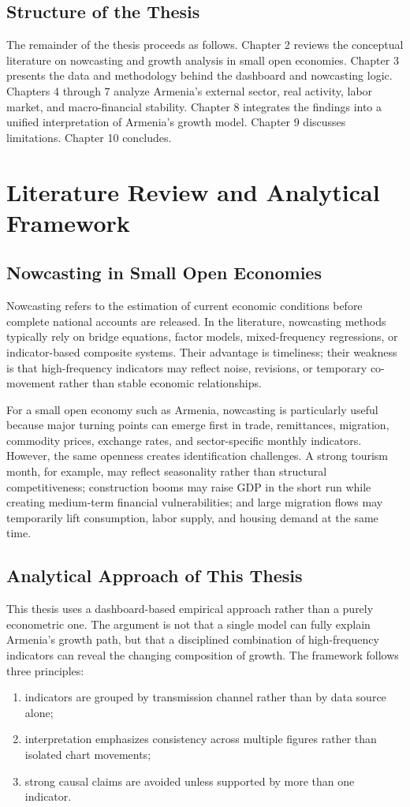 \documentclass[12pt,a4paper]{report}
\begin{document}
\section{Structure of the Thesis}
The remainder of the thesis proceeds as follows. Chapter 2 reviews the conceptual literature on nowcasting and growth analysis in small open economies. Chapter 3 presents the data and methodology behind the dashboard and nowcasting logic. Chapters 4 through 7 analyze Armenia's external sector, real activity, labor market, and macro-financial stability. Chapter 8 integrates the findings into a unified interpretation of Armenia's growth model. Chapter 9 discusses limitations. Chapter 10 concludes.

\chapter{Literature Review and Analytical Framework}
\section{Nowcasting in Small Open Economies}
Nowcasting refers to the estimation of current economic conditions before complete national accounts are released. In the literature, nowcasting methods typically rely on bridge equations, factor models, mixed-frequency regressions, or indicator-based composite systems. Their advantage is timeliness; their weakness is that high-frequency indicators may reflect noise, revisions, or temporary co-movement rather than stable economic relationships.

For a small open economy such as Armenia, nowcasting is particularly useful because major turning points can emerge first in trade, remittances, migration, commodity prices, exchange rates, and sector-specific monthly indicators. However, the same openness creates identification challenges. A strong tourism month, for example, may reflect seasonality rather than structural competitiveness; construction booms may raise GDP in the short run while creating medium-term financial vulnerabilities; and large migration flows may temporarily lift consumption, labor supply, and housing demand at the same time.

\section{Analytical Approach of This Thesis}
This thesis uses a dashboard-based empirical approach rather than a purely econometric one. The argument is not that a single model can fully explain Armenia's growth path, but that a disciplined combination of high-frequency indicators can reveal the changing composition of growth. The framework follows three principles:
\begin{enumerate}
    \item indicators are grouped by transmission channel rather than by data source alone;
    \item interpretation emphasizes consistency across multiple figures rather than isolated chart movements;
    \item strong causal claims are avoided unless supported by more than one indicator.
\end{enumerate}
\end{document}
